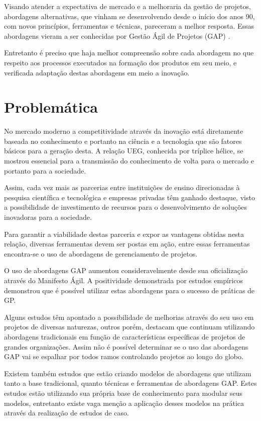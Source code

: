 Visando atender a expectativa de mercado e a melhoraria da gestão de projetos, abordagens alternativas, que vinham se desenvolvendo desde o início dos anos 90, com novos princípios, ferramentas e técnicas, pareceram a melhor resposta. Essas abordagens vieram a ser conhecidas por Gestão Ágil de Projetos (GAP) \cite{amaral2011gerenciamento}.

Entretanto é preciso que haja melhor compreensão sobre cada abordagem no que respeito aos processos executados na formação dos produtos em seu meio, e verificada adaptação destas abordagens em meio a inovação.

\section{Problemática}

No mercado moderno a competitividade através da inovação está diretamente baseada no conhecimento e portanto na ciência e a tecnologia que são fatores básicos para a geração desta. A relação UEG, conhecida por tríplice hélice, se mostrou essencial para a transmissão do conhecimento de volta para o mercado e portanto para a sociedade.

Assim, cada vez mais as parcerias entre instituições de ensino direcionadas à pesquisa científica e tecnológica e empresas privadas têm ganhado destaque, visto a possibilidade de investimento de recursos para o desenvolvimento de soluções inovadoras para a sociedade.

Para garantir a viabilidade destas parceria e expor as vantagens obtidas nesta relação, diversas ferramentas devem ser postas em ação, entre essas ferramentas encontra-se o uso de abordagens de gerenciamento de projetos.

O uso de abordagens GAP aumentou consideravelmente desde sua oficialização através do Manifesto Ágil. A positividade demonstrada por estudos empíricos demonstrou que é possível utilizar estas abordagens para o sucesso de práticas de GP.

Alguns estudos têm apontado a possibilidade de melhorias através do seu uso em projetos de diversas naturezas, outros porém, destacam que continuam utilizando abordagens tradicionais em função de características específicas de projetos de grandes organizações. Assim não é possível determinar se o uso das abordagens GAP vai se espalhar por todos ramos controlando projetos ao longo do globo.

Existem também estudos que estão criando modelos de abordagens que utilizam tanto a base tradicional, quanto técnicas e ferramentas de abordagens GAP. Estes estudos estão utilizando sua própria base de conhecimento para modular seus modelos, entretanto existe vaga menção a aplicação desses modelos na prática através da realização de estudos de caso.

